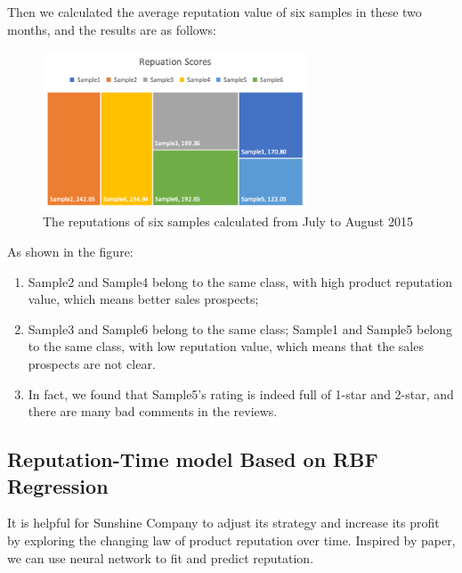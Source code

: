 \documentclass{mcmthesis}
\begin{document}
Then we calculated the average reputation value of six samples in these two months, and the results are as follows:
\begin{figure}[H] 
	\centering 
	\includegraphics[width=0.7\textwidth]{figures/reputations.png} 
	\caption{The reputations of six samples calculated from July to August 2015}
	\label{reputations} %
\end{figure}

As shown in the figure:
\begin{enumerate}
	\item Sample2 and Sample4 belong to the same class, with high product reputation value, which means better sales prospects; 
	\item Sample3 and Sample6 belong to the same class; Sample1 and Sample5 belong to the same class, with low reputation value, which means that the sales prospects are not clear.
	\item  In fact, we found that Sample5's rating is indeed full of 1-star and 2-star, and there are many bad comments in the reviews.
\end{enumerate}

\subsection{Reputation-Time model Based on RBF Regression}
\label{5.3}
It is helpful for Sunshine Company to adjust its strategy and increase its profit by exploring the changing law of product reputation over time. Inspired by paper\cite{tang2015user}, we can use neural network to fit and predict reputation.
\end{document}

